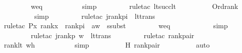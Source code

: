 \begin{isabellebody}
\ \ \ \ \ \ \ \isamarkupfalse%
\ weq\ \isanewline
\ \ \ \ \ \ \ \ \isamarkupfalse%
\ simp\isanewline
\ \ \ \ \ \ \ \isamarkupfalse%
\ {\isacharparenleft}{\kern0pt}rule{\isacharunderscore}{\kern0pt}tac\ lt{\isacharunderscore}{\kern0pt}succ{\isacharunderscore}{\kern0pt}lt{\isacharparenright}{\kern0pt}\ \isanewline
\ \ \ \ \ \ \ \isamarkupfalse%
\ Ord{\isacharunderscore}{\kern0pt}rank\ \isanewline
\ \ \ \ \ \ \ \ \isamarkupfalse%
\ simp\isanewline
\ \ \ \ \ \ \ \isamarkupfalse%
\ {\isacharparenleft}{\kern0pt}rule{\isacharunderscore}{\kern0pt}tac\ j{\isacharequal}{\kern0pt}{\isachardoublequoteopen}rank{\isacharparenleft}{\kern0pt}pi{\isacharparenright}{\kern0pt}{\isachardoublequoteclose}\ \ lt{\isacharunderscore}{\kern0pt}trans{\isacharparenright}{\kern0pt}\ \isanewline
\ \ \ \ \ \ \ \isamarkupfalse%
\ {\isacharparenleft}{\kern0pt}rule{\isacharunderscore}{\kern0pt}tac\ P{\isacharequal}{\kern0pt}{\isachardoublequoteopen}{\isasymlambda}x{\isachardot}{\kern0pt}\ rank{\isacharparenleft}{\kern0pt}x{\isacharparenright}{\kern0pt}\ {\isacharless}{\kern0pt}\ rank{\isacharparenleft}{\kern0pt}pi{\isacharparenright}{\kern0pt}{\isachardoublequoteclose}\ \ a{\isacharequal}{\kern0pt}w\ \ ssubst{\isacharparenright}{\kern0pt}\isanewline
\ \ \ \ \ \ \ \isamarkupfalse%
\ weq\ \isanewline
\ \ \ \ \ \ \ \ \ \isamarkupfalse%
\ simp\isanewline
\ \ \ \ \ \ \ \isamarkupfalse%
\ {\isacharparenleft}{\kern0pt}rule{\isacharunderscore}{\kern0pt}tac\ j{\isacharequal}{\kern0pt}{\isachardoublequoteopen}rank{\isacharparenleft}{\kern0pt}{\isacharless}{\kern0pt}p{\isacharcomma}{\kern0pt}\ w{\isachargreater}{\kern0pt}{\isacharparenright}{\kern0pt}{\isachardoublequoteclose}\ \ lt{\isacharunderscore}{\kern0pt}trans{\isacharparenright}{\kern0pt}\isanewline
\ \ \ \ \ \ \ \isamarkupfalse%
\ {\isacharparenleft}{\kern0pt}rule{\isacharunderscore}{\kern0pt}tac\ rank{\isacharunderscore}{\kern0pt}pair{}{\isacharparenright}{\kern0pt}\isanewline
\ \ \ \ \ \ \ \isamarkupfalse%
\ rank{\isacharunderscore}{\kern0pt}lt\ wh\ \isanewline
\ \ \ \ \ \ \ \ \isamarkupfalse%
\ simp\ \isanewline
\ \ \ \ \ \ \ \isamarkupfalse%
\ H\ rank{\isacharunderscore}{\kern0pt}pair{}\ \isanewline
\ \ \ \ \ \ \ \isamarkupfalse%
\ auto\isanewline
\ \ \ \isamarkupfalse%
\isanewline

\end{isabellebody}

